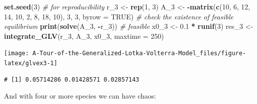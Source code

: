 \documentclass[
]{book}
\newenvironment{Shaded}{\begin{snugshade}}{\end{snugshade}}
\newcommand{\CommentTok}[1]{\textcolor[rgb]{0.56,0.35,0.01}{\textit{#1}}}
\newcommand{\DataTypeTok}[1]{\textcolor[rgb]{0.13,0.29,0.53}{#1}}
\newcommand{\DecValTok}[1]{\textcolor[rgb]{0.00,0.00,0.81}{#1}}
\newcommand{\FloatTok}[1]{\textcolor[rgb]{0.00,0.00,0.81}{#1}}
\newcommand{\KeywordTok}[1]{\textcolor[rgb]{0.13,0.29,0.53}{\textbf{#1}}}
\newcommand{\NormalTok}[1]{#1}
\newcommand{\OperatorTok}[1]{\textcolor[rgb]{0.81,0.36,0.00}{\textbf{#1}}}
\newcommand{\OtherTok}[1]{\textcolor[rgb]{0.56,0.35,0.01}{#1}}
\newcommand{\StringTok}[1]{\textcolor[rgb]{0.31,0.60,0.02}{#1}}
\begin{document}
\begin{Shaded}
\begin{Highlighting}[]
\KeywordTok{set.seed}\NormalTok{(}\DecValTok{3}\NormalTok{) }\CommentTok{# for reproducibility}
\NormalTok{r_}\DecValTok{3}\NormalTok{ <-}\StringTok{ }\KeywordTok{rep}\NormalTok{(}\DecValTok{1}\NormalTok{, }\DecValTok{3}\NormalTok{)}
\NormalTok{A_}\DecValTok{3}\NormalTok{ <-}\StringTok{ }\OperatorTok{-}\KeywordTok{matrix}\NormalTok{(}\KeywordTok{c}\NormalTok{(}\DecValTok{10}\NormalTok{, }\DecValTok{6}\NormalTok{, }\DecValTok{12}\NormalTok{, }
                 \DecValTok{14}\NormalTok{, }\DecValTok{10}\NormalTok{, }\DecValTok{2}\NormalTok{, }
                 \DecValTok{8}\NormalTok{, }\DecValTok{18}\NormalTok{, }\DecValTok{10}\NormalTok{), }\DecValTok{3}\NormalTok{, }\DecValTok{3}\NormalTok{, }\DataTypeTok{byrow =} \OtherTok{TRUE}\NormalTok{)}
\CommentTok{# check the existence of feasible equilibrium}
\KeywordTok{print}\NormalTok{(}\KeywordTok{solve}\NormalTok{(A_}\DecValTok{3}\NormalTok{, }\OperatorTok{-}\NormalTok{r_}\DecValTok{3}\NormalTok{)) }\CommentTok{# feasible}
\NormalTok{x0_}\DecValTok{3}\NormalTok{ <-}\StringTok{ }\FloatTok{0.1} \OperatorTok{*}\StringTok{ }\KeywordTok{runif}\NormalTok{(}\DecValTok{3}\NormalTok{)}
\NormalTok{res_}\DecValTok{3}\NormalTok{ <-}\StringTok{ }\KeywordTok{integrate_GLV}\NormalTok{(r_}\DecValTok{3}\NormalTok{, A_}\DecValTok{3}\NormalTok{, x0_}\DecValTok{3}\NormalTok{, }\DataTypeTok{maxtime =} \DecValTok{250}\NormalTok{)}
\end{Highlighting}
\end{Shaded}

\begin{center}\texttt{[image: A-Tour-of-the-Generalized-Lotka-Volterra-Model\_files/figure-latex/glvex3-1]} \end{center}

\begin{verbatim}
# [1] 0.05714286 0.01428571 0.02857143
\end{verbatim}

And with four or more species we can have chaos:
\end{document}
